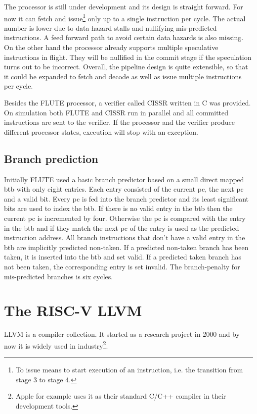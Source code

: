 \documentclass[12pt,twoside,notitlepage]{report}
\begin{document}
The processor is still under development and its design is straight forward. For now it can fetch and issue\footnote{To issue means to start execution of an instruction, i.e. the transition from stage 3 to stage 4.} only up to a single instruction per cycle. The actual number is lower due to data hazard stalls and nullifying mis-predicted instructions. A feed forward path to avoid certain data hazards is also missing. On the other hand the processor already supports multiple speculative instructions in flight. They will be nullified in the commit stage if the speculation turns out to be incorrect. Overall, the pipeline design is quite extensible, so that it could be expanded to fetch and decode as well as issue multiple instructions per cycle.

Besides the FLUTE processor, a verifier called CISSR written in C was provided. On simulation both FLUTE and CISSR run in parallel and all committed instructions are sent to the verifier. If the processor and the verifier produce different processor states, execution will stop with an exception.

\subsection{Branch prediction}

Initially FLUTE used a basic branch predictor based on a small direct mapped \gls{btb} with only eight entries. 
Each entry consisted of the current \gls{pc}, the next \gls{pc} and a valid bit. Every \gls{pc} is fed into the branch predictor and its least significant bits are used to index the \gls{btb}.
If there is no valid entry in the \gls{btb} then the current \gls{pc} is incremented by four. Otherwise the \gls{pc} is compared with the entry in the \gls{btb} and if they match the next \gls{pc} of the entry is used as the predicted instruction address. All branch instructions that don't have a valid entry in the \gls{btb} are implicitly predicted non-taken. If a predicted non-taken branch has been taken, it is inserted into the \gls{btb} and set valid. If a predicted taken branch has not been taken, the corresponding entry is set invalid.
The branch-penalty for mis-predicted branches is six cycles.


\section{The RISC-V LLVM}

LLVM is a compiler collection. It started as a research project in 2000 and by now it is widely used in industry\footnote{Apple for example uses it as their standard C/C++ compiler in their development tools\cite{AppleXCode}.}.
\end{document}
